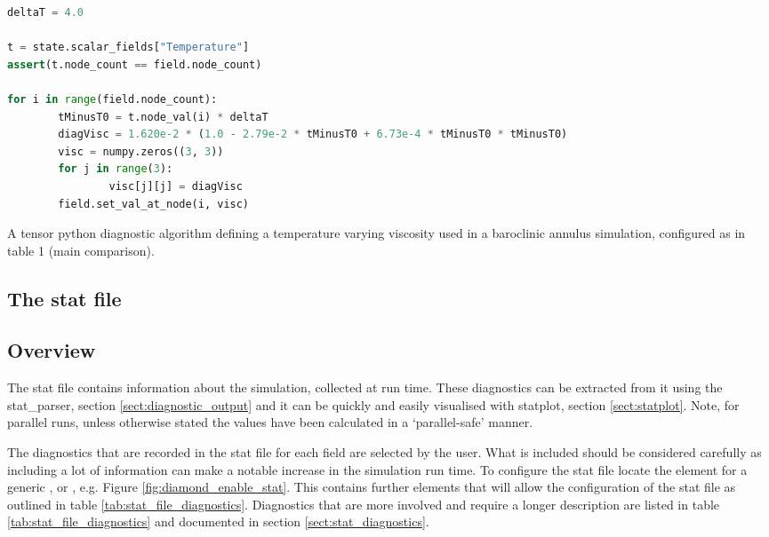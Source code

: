 \begin{example}
\begin{lstlisting}[language = Python]
deltaT = 4.0

t = state.scalar_fields["Temperature"]
assert(t.node_count == field.node_count)

for i in range(field.node_count):
        tMinusT0 = t.node_val(i) * deltaT
        diagVisc = 1.620e-2 * (1.0 - 2.79e-2 * tMinusT0 + 6.73e-4 * tMinusT0 * tMinusT0)
        visc = numpy.zeros((3, 3))
        for j in range(3):
                visc[j][j] = diagVisc
        field.set_val_at_node(i, visc)
\end{lstlisting}
\caption{A tensor python diagnostic algorithm defining a temperature varying
         viscosity used in a baroclinic annulus simulation, configured
         as in \citet{hignett1985} table 1 (main comparison).}
\end{example}

\subsection{The stat file}
\label{sect:diagnostics_stat_file}

\subsection{Overview}
The stat file contains information about the simulation, collected at run time. These diagnostics can be extracted from it using the stat\_parser, section \ref{sect:diagnostic_output} and it can be quickly and easily visualised with statplot, section \ref{sect:statplot}. Note, for parallel runs, unless otherwise stated the values have been calculated in a `parallel-safe' manner.

The diagnostics that are recorded in the stat file for each field are selected by the user.  What is included should be considered carefully as including a lot of information can make a notable increase in the simulation run time. To configure the stat file locate the  element for a generic ,  or , e.g. Figure \ref{fig:diamond_enable_stat}. This contains further elements that will allow the configuration of the stat file as outlined in table \ref{tab:stat_file_diagnostics}. Diagnostics that are more involved and require a longer description are listed in table \ref{tab:stat_file_diagnostics} and documented in section \ref{sect:stat_diagnostics}.

